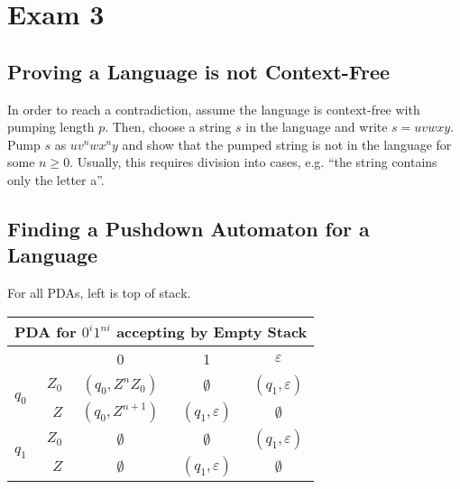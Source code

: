 \section{Exam 3}\label{sec:exam-3-cheatsheet}

\subsection{Proving a Language is not Context-Free}
In order to reach a contradiction, assume the language is context-free with pumping length \(p\). Then, choose a string \(s\) in the language and write \(s=uvwxy\). Pump \(s\) as \(u v^n w x^n y\) and show that the pumped string is not in the language for some \(n\geq0\). Usually, this requires division into cases, e.g. ``the string contains only the letter a''.

\subsection{Finding a Pushdown Automaton for a Language}
For all PDAs, left is top of stack.

\begin{center}\begin{tabular}{l r c c c}
    \multicolumn{5}{c}{PDA for \(0^i 1^{ni}\) accepting by Empty Stack}\\\bottomrule
    & & 0 & 1 & \(\varepsilon \) \\\cmidrule{3-5}
    \multirow{2}{*}{\(q_0\)} & \(Z_0\) & \((q_0, Z^n Z_0)\) & \(\emptyset \) & \((q_1, \varepsilon)\) \\
    & \(Z\) & \((q_0, Z^{n+1})\)  & \((q_1, \varepsilon) \) & \(\emptyset \) \\\midrule
    \multirow{2}{*}{\(q_1\)} & \(Z_0\) & \(\emptyset \) & \(\emptyset \) & \((q_1, \varepsilon)\) \\
    & \(Z\) & \(\emptyset \) & \((q_1, \varepsilon)\) & \(\emptyset \) \\
\end{tabular}\end{center}

